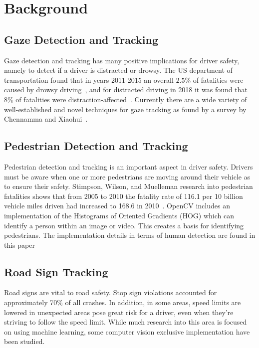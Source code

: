 \section{Background}
\subsection{Gaze Detection and Tracking}

Gaze detection and tracking has many positive implications for driver safety, namely to detect if a driver is distracted or drowsy. The US department of transportation found that in years 2011-2015 an overall $2.5\%$ of fatalities were caused by drowsy driving~\cite{CrashDrowsy}, and for distracted driving in 2018 it was found that $8\%$ of fatalities were distraction-affected~\cite{CrashDistracted}. Currently there are a wide variety of well-established and novel techniques for gaze tracking as found by a survey by Chennamma and Xiaohui~\cite{chennamma2013survey}. 

\subsection{Pedestrian Detection and Tracking}

Pedestrian detection and tracking is an important aspect in driver safety. Drivers must be aware when one or more pedestrians are moving around their vehicle as to ensure their safety. Stimpson, Wilson, and Muelleman research into pedestrian fatalities shows that from 2005 to 2010 the fatality rate of 116.1 per 10 billion vehicle miles driven had increased to 168.6 in 2010~\cite{PedestrianFatalities}.
OpenCV includes an implementation of the Histograms of Oriented Gradients (HOG) which can identify a person within an image or video. This creates a basis for identifying pedestrians.
The implementation details in terms of human detection are found in this paper\cite{HOGHumanDetection}

\subsection{Road Sign Tracking}
Road signs are vital to road safety. 
Stop sign violations accounted for approximately 70\% of all crashes.\cite{Pubmed}
In addition, in some areas, speed limits are lowered in unexpected areas pose great risk for a driver, even when they're striving to follow the speed limit.
While much research into this area is focused on using machine learning, some computer vision exclusive implementation have been studied.\cite{Ayaou2020}